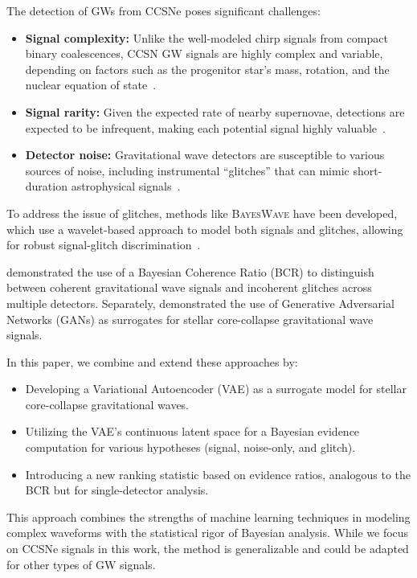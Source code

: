 \documentclass[twocolumn]{aastex631}
\begin{document}
The detection of GWs from CCSNe poses significant challenges:
\begin{itemize}
    \item \textbf{Signal complexity: } Unlike the well-modeled chirp signals from compact binary coalescences, CCSN GW signals are highly complex and variable, depending on factors such as the progenitor star's mass, rotation, and the nuclear equation of state~\cite{}.
    \item \textbf{Signal rarity:} Given the expected rate of nearby supernovae, detections are expected to be infrequent, making each potential signal highly valuable~\cite{}.
    \item \textbf{Detector noise:} Gravitational wave detectors are susceptible to various sources of noise, including instrumental ``glitches'' that can mimic short-duration astrophysical signals~\cite{}.
\end{itemize}

To address the issue of glitches, methods like \textsc{BayesWave} have been developed, which use a wavelet-based approach to model both signals and glitches, allowing for robust signal-glitch discrimination~\cite{}.

\citet{Isi:2018:PhRvD} demonstrated the use of a Bayesian Coherence Ratio (BCR) to distinguish between coherent gravitational wave signals and incoherent glitches across multiple detectors. Separately, \citet{Eccleston:2024:PhRvD} demonstrated the use of Generative Adversarial Networks (GANs) as surrogates for stellar core-collapse gravitational wave signals.


In this paper, we combine and extend these approaches by:
\begin{itemize}
    \item Developing a Variational Autoencoder (VAE) as a surrogate model for stellar core-collapse gravitational waves.
    \item Utilizing the VAE's continuous latent space for a Bayesian evidence computation for various hypotheses (signal, noise-only, and glitch).
    \item Introducing a new ranking statistic based on evidence ratios, analogous to the BCR but for single-detector analysis.
\end{itemize}

This approach combines the strengths of machine learning techniques in modeling complex waveforms with the statistical rigor of Bayesian analysis. 
While we focus on CCSNe signals in this work, the method is generalizable and could be adapted for other types of GW signals.
\end{document}
